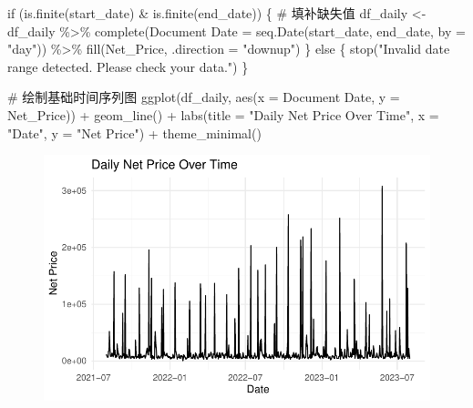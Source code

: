 \documentclass[
  letterpaper,
  DIV=11,
  numbers=noendperiod]{scrartcl}
\newenvironment{Shaded}{\begin{snugshade}}{\end{snugshade}}
\newcommand{\AttributeTok}[1]{\textcolor[rgb]{0.40,0.45,0.13}{#1}}
\newcommand{\CommentTok}[1]{\textcolor[rgb]{0.37,0.37,0.37}{#1}}
\newcommand{\ControlFlowTok}[1]{\textcolor[rgb]{0.00,0.23,0.31}{#1}}
\newcommand{\FunctionTok}[1]{\textcolor[rgb]{0.28,0.35,0.67}{#1}}
\newcommand{\NormalTok}[1]{\textcolor[rgb]{0.00,0.23,0.31}{#1}}
\newcommand{\OtherTok}[1]{\textcolor[rgb]{0.00,0.23,0.31}{#1}}
\newcommand{\SpecialCharTok}[1]{\textcolor[rgb]{0.37,0.37,0.37}{#1}}
\newcommand{\StringTok}[1]{\textcolor[rgb]{0.13,0.47,0.30}{#1}}
\begin{document}
\begin{Shaded}
\begin{Highlighting}[]
\ControlFlowTok{if}\NormalTok{ (}\FunctionTok{is.finite}\NormalTok{(start\_date) }\SpecialCharTok{\&} \FunctionTok{is.finite}\NormalTok{(end\_date)) \{}
  \CommentTok{\# 填补缺失值}
\NormalTok{  df\_daily }\OtherTok{\textless{}{-}}\NormalTok{ df\_daily }\SpecialCharTok{\%\textgreater{}\%}
    \FunctionTok{complete}\NormalTok{(}\StringTok{\textasciigrave{}}\AttributeTok{Document Date}\StringTok{\textasciigrave{}} \OtherTok{=} \FunctionTok{seq.Date}\NormalTok{(start\_date, end\_date, }\AttributeTok{by =} \StringTok{"day"}\NormalTok{)) }\SpecialCharTok{\%\textgreater{}\%}
    \FunctionTok{fill}\NormalTok{(Net\_Price, }\AttributeTok{.direction =} \StringTok{"downup"}\NormalTok{)}
\NormalTok{\} }\ControlFlowTok{else}\NormalTok{ \{}
  \FunctionTok{stop}\NormalTok{(}\StringTok{"Invalid date range detected. Please check your data."}\NormalTok{)}
\NormalTok{\}}

\CommentTok{\# 绘制基础时间序列图}
\FunctionTok{ggplot}\NormalTok{(df\_daily, }\FunctionTok{aes}\NormalTok{(}\AttributeTok{x =} \StringTok{\textasciigrave{}}\AttributeTok{Document Date}\StringTok{\textasciigrave{}}\NormalTok{, }\AttributeTok{y =}\NormalTok{ Net\_Price)) }\SpecialCharTok{+}
  \FunctionTok{geom\_line}\NormalTok{() }\SpecialCharTok{+}
  \FunctionTok{labs}\NormalTok{(}\AttributeTok{title =} \StringTok{"Daily Net Price Over Time"}\NormalTok{, }\AttributeTok{x =} \StringTok{"Date"}\NormalTok{, }\AttributeTok{y =} \StringTok{"Net Price"}\NormalTok{) }\SpecialCharTok{+}
  \FunctionTok{theme\_minimal}\NormalTok{()}
\end{Highlighting}
\end{Shaded}

\begin{figure}[H]

{\centering \includegraphics{Time-Serise-EDA_files/figure-pdf/unnamed-chunk-1-1.pdf}

}

\end{figure}
\end{document}

